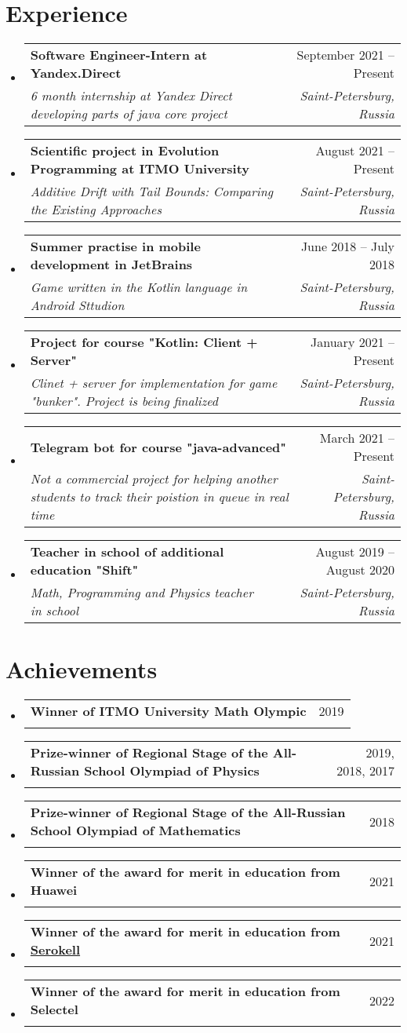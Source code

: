 \documentclass[letterpaper,10pt]{article}
\makeatletter
\newcommand{\resumeSubheading}[4]{
  \vspace{-2pt}\item
    \begin{tabular*}{0.97\textwidth}[t]{l@{\extracolsep{\fill}}r}
      \textbf{#1} & #2 \\
      \textit{\small#3} & \textit{\small #4} \\
    \end{tabular*}\vspace{-7pt}
}
\newcommand{\resumeSubHeadingListStart}{\begin{itemize}[leftmargin=0.15in, label={}]}
\newcommand{\resumeSubHeadingListEnd}{\end{itemize}}
\makeatother
\begin{document}
\section{Experience}
    \resumeSubHeadingListStart
        \resumeSubheading
            {Software Engineer-Intern at Yandex.Direct}{September 2021 -- Present}
            {6 month internship at Yandex Direct developing parts of java core project}{Saint-Petersburg, Russia}
  \resumeSubHeadingListEnd
  \resumeSubHeadingListStart
        \resumeSubheading
            {Scientific project in Evolution Programming at ITMO University}{August 2021 -- Present}
            {Additive Drift with Tail Bounds: Comparing the Existing Approaches}{Saint-Petersburg, Russia}
  \resumeSubHeadingListEnd
  \resumeSubHeadingListStart
    \resumeSubheading
      {Summer practise in mobile development in JetBrains}{June 2018 -- July 2018}
      {Game written in the Kotlin language in Android Sttudion}{Saint-Petersburg, Russia}
  \resumeSubHeadingListEnd
  \resumeSubHeadingListStart
    \resumeSubheading
      {Project for course "Kotlin: Client + Server"}{January 2021 -- Present}
      {Clinet + server for implementation for game "bunker". Project is being finalized}{Saint-Petersburg, Russia}
  \resumeSubHeadingListEnd
  \resumeSubHeadingListStart
    \resumeSubheading
      {Telegram bot for course "java-advanced"}{March 2021 -- Present}
      {Not a commercial project for helping another students to track their poistion in queue in real time}{Saint-Petersburg, Russia}
  \resumeSubHeadingListEnd
  \resumeSubHeadingListStart
    \resumeSubheading
      {Teacher in school of additional education "Shift"}{August 2019 -- August 2020}
      {Math, Programming and Physics teacher in school}{Saint-Petersburg, Russia}
  \resumeSubHeadingListEnd

\section{Achievements}
\resumeSubHeadingListStart
  \resumeSubheading
    {Winner of ITMO University Math Olympic}{2019}
    {}{}
    \resumeSubheading
    {Prize-winner of Regional Stage of the All-Russian School Olympiad of Physics}{2019, 2018, 2017}
    {}{}
    \resumeSubheading
    {Prize-winner of Regional Stage of the All-Russian School Olympiad of Mathematics}{2018}
    {}{}
    \resumeSubheading
    {Winner of the award for merit in education from Huawei}{2021}
    {}{}
    \resumeSubheading
    {Winner of the award for merit in education from  \href{serokell.io}{Serokell}}{2021}
    {}{}
    \resumeSubheading
    {Winner of the award for merit in education from Selectel}{2022}
    {}{}
\resumeSubHeadingListEnd
\end{document}
